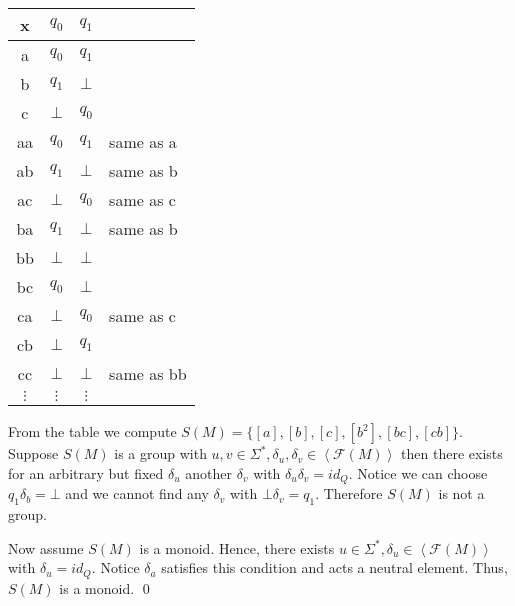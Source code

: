 \documentclass[a4paper,12pt,numbers=noenddot]{scrreport}
\def\lsk{\left<}
\def\rsk{\right>}
\begin{document}
\chapter{}
\section{}
\section{}
\section{}
\begin{center}
\begin{tabular}{c|cc|l}
x & $q_0$ & $q_1$   \\ \hline
a & $q_0$ & $q_1$   \\
b & $q_1$ & $\bot$  \\
c & $\bot$ & $q_0$  \\ \hline
aa & $q_0$ & $q_1$ & same as a \\ 
ab & $q_1$ & $\bot$ & same as b \\ 
ac & $\bot$ & $q_0$ & same as c \\ 
ba & $q_1$ & $\bot$ & same as b \\ 
bb & $\bot$ & $\bot$ \\ 
bc & $q_0$ & $\bot$ \\ 
ca & $\bot$ & $q_0$ & same as c \\ 
cb & $\bot$ & $q_1$ \\ 
cc & $\bot$ & $\bot$ & same as bb \\ \hline
$\vdots$ & $\vdots$ & $\vdots$ & \\
\end{tabular}
\end{center}
From the table we compute $S(M) = \{[a], [b], [c], [b^2], [bc], [cb]\}$.
Suppose $S(M)$ is a group with $u,v \in \Sigma^*, \delta_u, \delta_v \in \lsk \mathcal{F}(M) \rsk$ then there exists for an arbitrary but fixed $\delta_u$ another $\delta_v$ with $\delta_u \delta_v = id_Q$.
Notice we can choose $q_1\delta_b = \bot$ and we cannot find any $\delta_v$ with $\bot \delta_v = q_1$.
Therefore $S(M)$ is not a group.

Now assume $S(M)$ is a monoid.
Hence, there exists $u \in \Sigma^*, \delta_u \in \lsk \mathcal{F}(M) \rsk$ with $\delta_u = id_Q$.
Notice $\delta_a$ satisfies this condition and acts a neutral element.
Thus, $S(M)$ is a monoid.
\qed

\section{}
\end{document}
